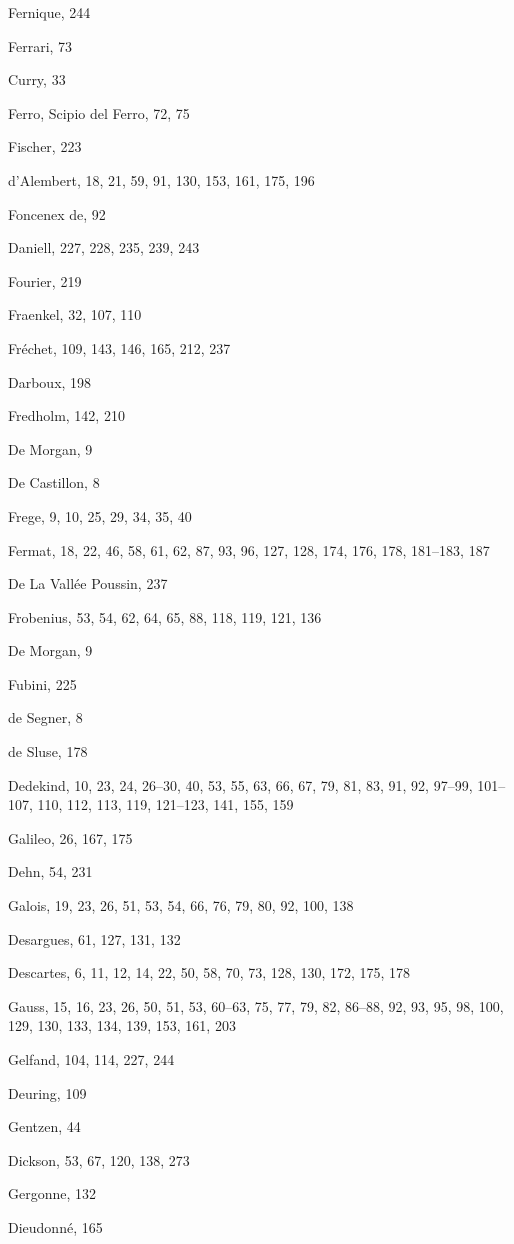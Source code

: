 Fernique, 244

Ferrari, 73

Curry, 33

Ferro, Scipio del Ferro, 72, 75

Fischer, 223

d'Alembert, 18, 21, 59, 91, 130, 153, 161, 175, 196

Foncenex de, 92

Daniell, 227, 228, 235, 239, 243

Fourier, 219

Fraenkel, 32, 107, 110

Fréchet, 109, 143, 146, 165, 212, 237

Darboux, 198

Fredholm, 142, 210

De Morgan, 9

De Castillon, 8

Frege, 9, 10, 25, 29, 34, 35, 40

Fermat, 18, 22, 46, 58, 61, 62, 87, 93, 96, 127, 128, 174, 176, 178, 181--183, 187

De La Vallée Poussin, 237

Frobenius, 53, 54, 62, 64, 65, 88, 118, 119, 121, 136

De Morgan, 9

Fubini, 225

de Segner, 8

de Sluse, 178

Dedekind, 10, 23, 24, 26--30, 40, 53, 55, 63, 66, 67, 79, 81, 83, 91, 92, 97--99, 101--107, 110, 112, 113, 119, 121--123, 141, 155, 159

Galileo, 26, 167, 175

Dehn, 54, 231

Galois, 19, 23, 26, 51, 53, 54, 66, 76, 79, 80, 92, 100, 138

Desargues, 61, 127, 131, 132

Descartes, 6, 11, 12, 14, 22, 50, 58, 70, 73, 128, 130, 172, 175, 178

Gauss, 15, 16, 23, 26, 50, 51, 53, 60--63, 75, 77, 79, 82, 86--88, 92, 93, 95, 98, 100, 129, 130, 133, 134, 139, 153, 161, 203

Gelfand, 104, 114, 227, 244

Deuring, 109

Gentzen, 44

Dickson, 53, 67, 120, 138, 273

Gergonne, 132

Dieudonné, 165

